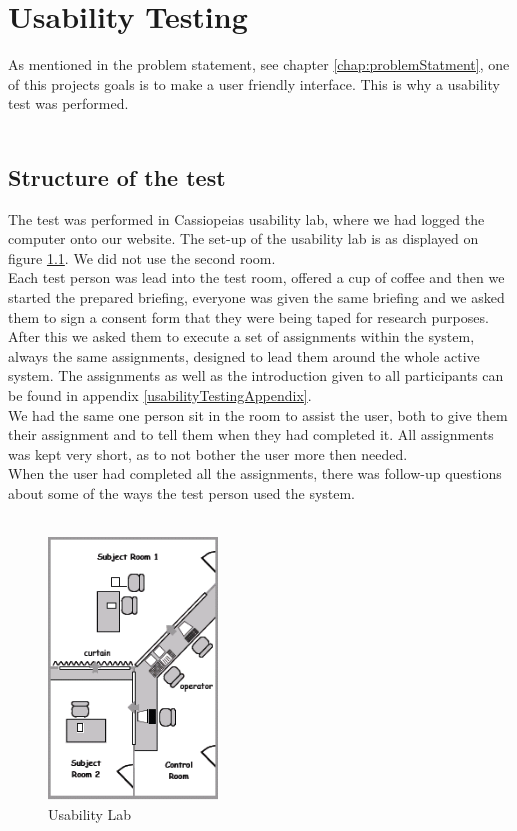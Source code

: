 \chapter{Usability Testing}
\label{chap:usabilityTesting}
As mentioned in the problem statement, see chapter \vref{chap:problemStatment}, one of this projects goals is to make a user friendly interface. This is why a usability test was performed.\\
\\

\section{Structure of the test}
The test was performed in Cassiopeias usability lab, where we had logged the computer onto our website. The set-up of the usability lab is as displayed on figure \ref{fig:usabilitylab}. We did not use the second room.\\
Each test person was lead into the test room, offered a cup of coffee and then we started the prepared briefing, everyone was given the same briefing and we asked them to sign a consent form that they were being taped for research purposes.\\
After this we asked them to execute a set of assignments within the system, always the same assignments, designed to lead them around the whole active system. The assignments as well as the introduction given to all participants can be found in appendix \vref{usabilityTestingAppendix}.\\
We had the same one person sit in the room to assist the user, both to give them their assignment and to tell them when they had completed it. All assignments was kept very short, as to not bother the user more then needed.\\
When the user had completed all the assignments, there was follow-up questions about some of the ways the test person used the system.\\
\\

\begin{figure}[htbp]
	\centering
		\includegraphics[width=0.40\textwidth]{images/usabilitylab.png}
	\caption{Usability Lab}
	\label{fig:usabilitylab}
\end{figure}

